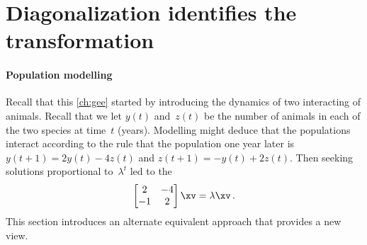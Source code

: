 

\section{Diagonalization identifies the transformation}
\label{sec:dit}

\secttoc
\begin{comment}
\pooliv{\S4.4} \layiv{\S5.3} \holti{\S6.4} \cite[\S09]{Davis99a}
\end{comment}


\paragraph{Population modelling} 
Recall that this \cref{ch:gee} started by introducing the dynamics of two interacting  of animals.
Recall that we let \(y(t)\) and~\(z(t)\) be the number of  animals in each of the two species at time~\(t\) (years). 
Modelling might deduce that the populations interact according to the rule that the population one year later is \(y(t+1)=2y(t)-4z(t)\) and \(z(t+1)=-y(t)+2z(t)\).
Then seeking solutions proportional to~\(\lambda^t\) led to the 
\begin{equation*}
\begin{bmatrix} 2&-4\\-1&2 \end{bmatrix}\xv=\lambda\xv\,.
\end{equation*}
This section introduces an alternate equivalent approach that provides a new view.

